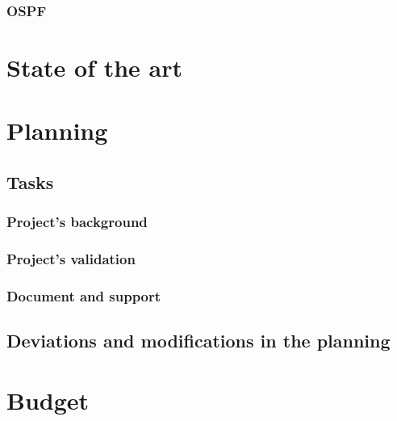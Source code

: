 \subsubsection{OSPF}


\section{State of the art}
\label{sec:soa}


\section{Planning}
\label{sec:tp}


\subsection{Tasks}


\subsubsection{Project's background}


\subsubsection{Project's validation}


\subsubsection{Document and support}



\subsection{Deviations and modifications in the planning}


\section{Budget} 

